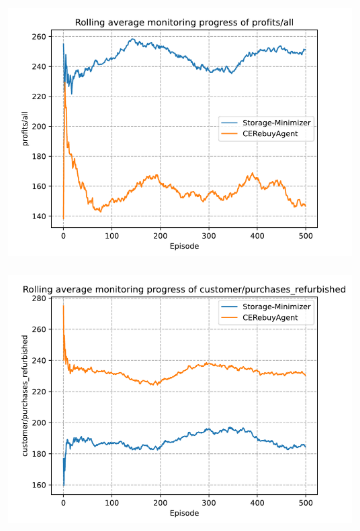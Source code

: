 \begin{figure}[t]
	\centering
	\begin{subfigure}{0.33\textwidth}
		\centering
		\includegraphics[width = \textwidth]{images/experiments/rulebased/RuleBasedMonitoringProfits.pdf}\\
		\label{fig:RulebasedAgentMonitoring1}
	\end{subfigure}
	\begin{subfigure}{0.32\textwidth}
		\centering
		\includegraphics[width = \textwidth]{images/experiments/rulebased/RuleBasedMonitoringPurchasesRefurbished.pdf}\\
		\label{fig:RulebasedAgentMonitoring2}
	\end{subfigure}

\end{figure}

